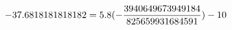 \documentclass[preview]{standalone}
\begin{document}
\begin{align*}
\special{dvisvgm:raw <g id='unique000'>}-37.6818181818182 = 5.8 (- \frac{3940649673949184}{825659931684591}) - 10\special{dvisvgm:raw </g>}
\end{align*}
\end{document}
